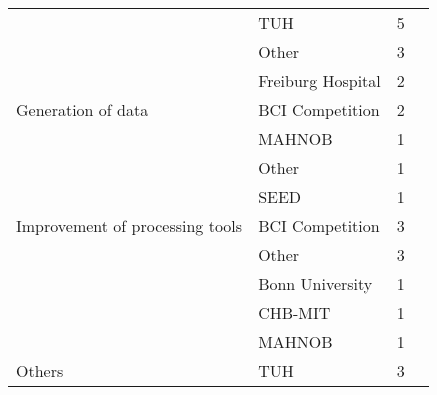 \begin{tabular}{llrl}
      & TUH &            5 &                                                 \cite{Golmohammadi2017b, Shah2017, Golmohammadi2017a, Golmohammadi2017, Yang2016b} \\
      & Other &            3 &                                                                                     \cite{Truong2018, Golmohammadi2017a, Taqi2017} \\
      & Freiburg Hospital &            2 &                                                                                                     \cite{Truong2018, Truong2018a} \\
Generation of data & BCI Competition &            2 &                                                                                                      \cite{Corley2018, Zhang2018b} \\
      & MAHNOB &            1 &                                                                                                                    \cite{Wang2018} \\
      & Other &            1 &                                                                                                              \cite{Schwabedal2018} \\
      & SEED &            1 &                                                                                                                    \cite{Wang2018} \\
Improvement of processing tools & BCI Competition &            3 &                                                                                              \cite{Yang2018, Sturm2016, Yang2016a} \\
      & Other &            3 &                                                                                            \cite{Yepes2017, Nurse2016, Stober2015} \\
      & Bonn University &            1 &                                                                                                                     \cite{Wen2018} \\
      & CHB-MIT &            1 &                                                                                                                     \cite{Wen2018} \\
      & MAHNOB &            1 &                                                                                                             \cite{drouin2016using} \\
Others & TUH &            3 &                                                                                     \cite{Schirrmeister2017a, Roy2018, Zhang2018a} \\

\end{tabular}
